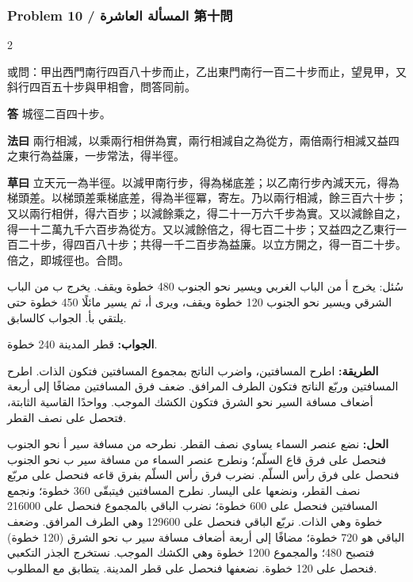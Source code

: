 \documentclass[11pt,a4paper]{article}
\newcommand{\ar}[1]{\arabicfont\beginR #1\endR}
\newcommand{\Answer}[1]{\par\noindent\textbf{\color{problemcolor}答} #1\par}
\newcommand{\Method}[1]{\par\noindent\textbf{\color{problemcolor}法曰} #1\par}
\newcommand{\Workings}[1]{\par\noindent\textbf{\color{problemcolor}草曰} #1\par}
\newcommand{\AnswerAr}{\par\noindent\textbf{\color{problemcolor}\ar{الجواب:}} }
\newcommand{\MethodAr}{\par\noindent\textbf{\color{problemcolor}\ar{الطريقة:}} }
\newcommand{\WorkingsAr}{\par\noindent\textbf{\color{problemcolor}\ar{الحل:}} }
\begin{document}
\vspace{0.5cm}

\subsubsection*{Problem 10 / \ar{المسألة العاشرة} \quad 第十問}

\begin{paracol}{2}

\noindent 或問：甲出西門南行四百八十步而止，乙出東門南行一百二十步而止，望見甲，又斜行四百五十步與甲相會，問答同前。

\vspace{0.2cm}

\Answer{城徑二百四十步。}

\vspace{0.2cm}

\Method{兩行相減，以乘兩行相併為實，兩行相減自之為從方，兩倍兩行相減又益四之東行為益廉，一步常法，得半徑。}

\vspace{0.2cm}

\Workings{立天元一為半徑。以減甲南行步，得為梯底差；以乙南行步內減天元，得為梯頭差。以梯頭差乘梯底差，得為半徑冪，寄左。乃以兩行相減，餘三百六十步；又以兩行相併，得六百步；以減餘乘之，得二十一万六千步為實。又以減餘自之，得一十二萬九千六百步為從方。又以減餘倍之，得七百二十步；又益四之乙東行一百二十步，得四百八十步；共得一千二百步為益廉。以立方開之，得一百二十步。倍之，即城徑也。合問。}

\switchcolumn

\ar{سُئل: يخرج أ من الباب الغربي ويسير نحو الجنوب 480 خطوة ويقف. يخرج ب من الباب الشرقي ويسير نحو الجنوب 120 خطوة ويقف، ويرى أ، ثم يسير مائلًا 450 خطوة حتى يلتقي بأ. الجواب كالسابق.}

\vspace{0.2cm}

\AnswerAr{قطر المدينة 240 خطوة.}

\vspace{0.2cm}

\MethodAr{اطرح المسافتين، واضرب الناتج بمجموع المسافتين فتكون الذات. اطرح المسافتين وربّع الناتج فتكون الطرف المرافق. ضعف فرق المسافتين مضافًا إلى أربعة أضعاف مسافة السير نحو الشرق فتكون الكشك الموجب. وواحدًا القاسية الثابتة، فتحصل على نصف القطر.}

\vspace{0.2cm}

\WorkingsAr{نضع عنصر السماء يساوي نصف القطر. نطرحه من مسافة سير أ نحو الجنوب فنحصل على فرق قاع السلّم؛ ونطرح عنصر السماء من مسافة سير ب نحو الجنوب فنحصل على فرق رأس السلّم. نضرب فرق رأس السلّم بفرق قاعه فنحصل على مربّع نصف القطر، ونضعها على اليسار. نطرح المسافتين فيتبقّى 360 خطوة؛ ونجمع المسافتين فنحصل على 600 خطوة؛ نضرب الباقي بالمجموع فنحصل على 216000 خطوة وهي الذات. نربّع الباقي فنحصل على 129600 وهي الطرف المرافق. وضعف الباقي هو 720 خطوة؛ مضافًا إلى أربعة أضعاف مسافة سير ب نحو الشرق (120 خطوة) فتصبح 480؛ والمجموع 1200 خطوة وهي الكشك الموجب. نستخرج الجذر التكعبي فنحصل على 120 خطوة. نضعفها فنحصل على قطر المدينة. يتطابق مع المطلوب.}

\end{paracol}
\end{document}
